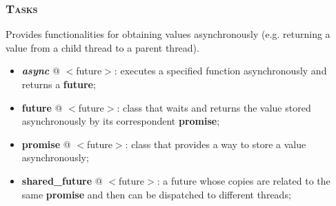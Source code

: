 \documentclass[10pt]{article}
\begin{document}
\begin{multicols*}{4}
{\subsubsection*{\textsc{Tasks}}
\noindent
Provides functionalities for obtaining values asynchronously (e.g. returning a value from a child thread to a parent thread).
\begin{itemize}[leftmargin=*,topsep=0.25pt]
  \setlength\itemsep{-1.8pt}
	\item  \emph{\textbf{async}} @ $<$future$>$: executes a specified function asynchronously and returns a \textbf{future};
	\item  {\textbf{future}} @ $<$future$>$: class that waits and returns the value stored asynchronously by its correspondent \textbf{promise};
	\item  {\textbf{promise}} @ $<$future$>$: class that provides a way to store a value asynchronously;
	\item  {\textbf{shared\_future}} @ $<$future$>$: a future whose copies are related to the same \textbf{promise} and then can be dispatched to different threads;
\end{itemize}


}
\end{multicols*}
\end{document}
